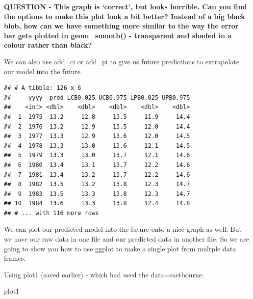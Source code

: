 \documentclass[]{book}
\newenvironment{Shaded}{\begin{snugshade}}{\end{snugshade}}
\newcommand{\DataTypeTok}[1]{\textcolor[rgb]{0.13,0.29,0.53}{#1}}
\newcommand{\DecValTok}[1]{\textcolor[rgb]{0.00,0.00,0.81}{#1}}
\newcommand{\KeywordTok}[1]{\textcolor[rgb]{0.13,0.29,0.53}{\textbf{#1}}}
\newcommand{\NormalTok}[1]{#1}
\newcommand{\OperatorTok}[1]{\textcolor[rgb]{0.81,0.36,0.00}{\textbf{#1}}}
\newcommand{\StringTok}[1]{\textcolor[rgb]{0.31,0.60,0.02}{#1}}
\begin{document}
\textbf{QUESTION - This graph is `correct', but looks horrible. Can you find the options to make this plot look a bit better? Instead of a big black blob, how can we have something more similar to the way the error bar gets plotted in geom\_smooth() - transparent and shaded in a colour rather than black?}

We can also use add\_ci or add\_pi to give us future predictions to extrapolate our model into the future

\begin{Shaded}
\end{Shaded}

\begin{verbatim}
## # A tibble: 126 x 6
##     yyyy  pred LCB0.025 UCB0.975 LPB0.025 UPB0.975
##    <int> <dbl>    <dbl>    <dbl>    <dbl>    <dbl>
##  1  1975  13.2     12.8     13.5     11.9     14.4
##  2  1976  13.2     12.9     13.5     12.0     14.4
##  3  1977  13.3     12.9     13.6     12.0     14.5
##  4  1978  13.3     13.0     13.6     12.1     14.5
##  5  1979  13.3     13.0     13.7     12.1     14.6
##  6  1980  13.4     13.1     13.7     12.2     14.6
##  7  1981  13.4     13.2     13.7     12.2     14.6
##  8  1982  13.5     13.2     13.8     12.3     14.7
##  9  1983  13.5     13.3     13.8     12.3     14.7
## 10  1984  13.6     13.3     13.8     12.4     14.8
## # ... with 116 more rows
\end{verbatim}

We can plot our predicted model into the future onto a nice graph as well. But - we have our raw data in one file and our predicted data in another file. So we are going to show you how to use ggplot to make a single plot from multple data frames.

Using plot1 (saved earlier) - which had used the data=eastbourne.

\begin{Shaded}
\begin{Highlighting}[]
\NormalTok{plot1}
\end{Highlighting}
\end{Shaded}
\end{document}
